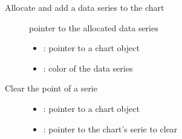 \documentclass[letterpaper,10pt,english]{sphinxmanual}
\begin{document}

\begin{fulllineitems}
\label{\detokenize{object-types/chart:_CPPv419lv_chart_add_seriesP8lv_obj_t10lv_color_t}}%
\pysigstartmultiline
{}\label{\detokenize{object-types/chart:lv__chart_8h_1ac58df9d2fd4b65ffccd7412c7ad3c78c}}%
\pysigstopmultiline
Allocate and add a data series to the chart \begin{description}
\item[{}] \leavevmode
pointer to the allocated data series 

\item[{}] \leavevmode\begin{itemize}
\item {} 
: pointer to a chart object 

\item {} 
: color of the data series 

\end{itemize}

\end{description}


\end{fulllineitems}


\begin{fulllineitems}
\label{\detokenize{object-types/chart:_CPPv420lv_chart_clear_serieP8lv_obj_tP17lv_chart_series_t}}%
\pysigstartmultiline
{}\label{\detokenize{object-types/chart:lv__chart_8h_1a44e2b5d195e23be824f636bcf350e85b}}%
\pysigstopmultiline
Clear the point of a serie \begin{description}
\item[{}] \leavevmode\begin{itemize}
\item {} 
: pointer to a chart object 

\item {} 
: pointer to the chart’s serie to clear 

\end{itemize}

\end{description}


\end{fulllineitems}
\end{document}
